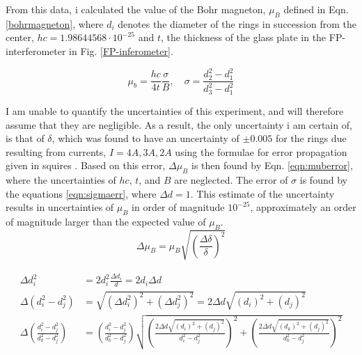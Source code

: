 \documentclass[11pt,a4paper]{article}
\begin{document}
      From this data, i calculated the value of the Bohr magneton, $\mu_B$ defined in Eqn. \ref{bohrmagneton}, where $d_i$ denotes the diameter of the rings in succession from the center, $hc = 1.98644568\cdot10^{-25}$ and $t$, the thickness of the glass plate in the FP-interferometer in Fig. \ref{FP-inferometer}.

      \begin{equation}
        \mu_b = \frac{hc}{4t} \frac{\sigma}{B},\quad \sigma = \frac{d_2^2 - d_1^2}{d_3^2 - d_1^2}
        \label{bohrmagneton}
      \end{equation}

      I am unable to quantify the uncertainties of this experiment, and will therefore assume that they are negligible. As a result, the only uncertainty i am certain of, is that of $\delta$, which was found to have an uncertainty of $\pm 0.005$ for the rings due resulting from currents, $I=4A, 3A, 2A$ using the formulae for error propagation given in squires \cite{squires_practical_2001}. Based on this error, $\Delta \mu_B$ is then found by Eqn. \ref{eqn:muberror}, where the uncertainties of $hc$, $t$, and $B$ are neglected. The error of $\sigma$ is found by the equations \ref{eqn:sigmaerr}, where $\Delta d =1$. This estimate of the uncertainty results in uncertainties of $\mu_B$ in order of magnitude $10^{-25}$, approximately an order of magnitude larger than the expected value of $\mu_B$.
      \begin{equation}
        \Delta \mu_B = \mu_B \sqrt{\left(\frac{\Delta \delta}{\delta}\right)^2}
        \label{eqn:muberror}
      \end{equation}

      \begin{align}
         \begin{split}
           \Delta d_i^2 &= 2d_i^2\frac{\Delta d_i}{d} = 2d_i\Delta d \\
           \Delta (d_i^2 - d_j^2 ) &= \sqrt{(\Delta d_i^2)^2 + (\Delta d_j^2)^2} = 2\Delta d\sqrt{(d_i)^2 + (d_j)^2} \\
           \Delta\left(\frac{d_i^2 - d_j^2}{d_k^2 - d_j^2}\right) &=
           \left(\frac{d_i^2 - d_j^2}{d_k^2 - d_j^2}\right) 
           \sqrt{ 
            \left(
            \frac{2\Delta d\sqrt{(d_i)^2 + (d_j)^2}}{d_i^2 - d_j^2}
            \right)^2 + 
            \left(
            \frac{2\Delta d\sqrt{(d_k)^2 + (d_j)^2}}{d_k^2 - d_j^2}
            \right)^2 
            }
         \end{split}
         \label{eqn:sigmaerr}
     \end{align} 
\end{document}
